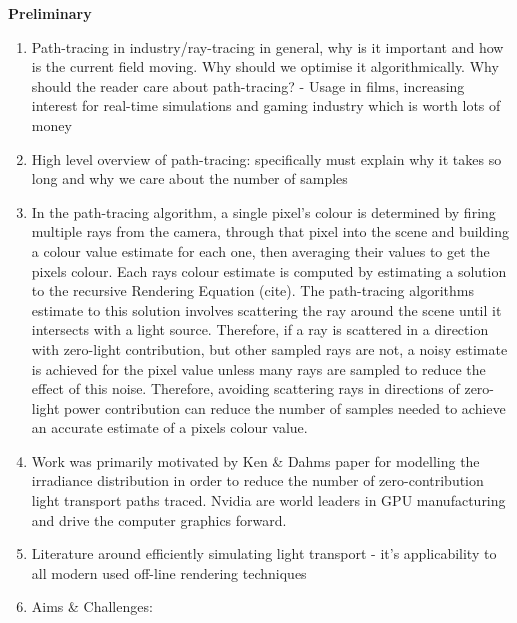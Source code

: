 \documentclass[ %
                    author={Callum Pearce},
                supervisor={Dr. Neill Campbell},
                    degree={MEng},
                     title={How effective are Temporal difference learning methods for reducing the number of zero contribution light paths while still accurately approximating Global Illumination in Path tracing?},
                  subtitle={},
                      type={research},
                      year={2019} ]{dissertation}
\begin{document}
\textbf{Preliminary}
\begin{enumerate}
\item Path-tracing in industry/ray-tracing in general, why is it important 
and how is the current field moving. Why should we optimise it algorithmically. 
Why should the reader care about path-tracing? - Usage in films, increasing
 interest for real-time simulations and gaming industry which is worth lots of money

\item High level overview of path-tracing: specifically must explain why it takes 
so long and why we care about the number of samples

\item In the path-tracing algorithm, a single pixel's colour is determined by firing 
multiple rays from the camera, through that pixel into the scene and building a 
colour value estimate for each one, then averaging their values to get the pixels 
colour. Each rays colour estimate is computed by estimating a solution to the recursive
Rendering Equation (cite). The path-tracing algorithms estimate to this solution involves 
scattering the ray around the scene until it intersects with a light source. Therefore, if a
 ray is scattered in a direction with zero-light contribution, but other sampled rays are not,
  a noisy estimate is achieved for the pixel value unless many rays are sampled to 
  reduce the effect of this noise. Therefore, avoiding  scattering rays in directions of 
  zero-light power contribution can reduce the number of samples needed to achieve 
  an accurate estimate of a pixels colour value.

\item Work was primarily motivated by Ken \& Dahms paper for modelling the irradiance
 distribution in order to reduce the number of zero-contribution light transport paths 
 traced. Nvidia are world leaders in GPU manufacturing and drive the computer 
 graphics forward.

\item Literature around efficiently simulating light transport - it's applicability to all 
modern used off-line rendering techniques

\item Aims \& Challenges:


\end{enumerate}
\end{document}
